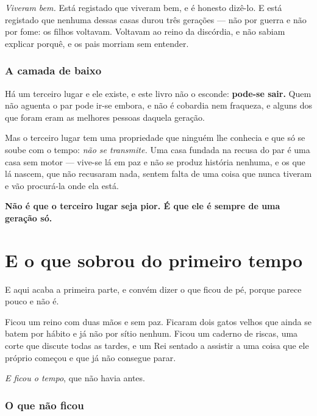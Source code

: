 \documentclass[livro.tex]{subfiles}
\begin{document}
\medskip

\emph{Viveram bem.} Está registado que viveram bem, e é honesto dizê-lo. E está registado que
nenhuma dessas casas durou três gerações --- não por guerra e não por fome: os filhos voltavam.
Voltavam ao reino da discórdia, e não sabiam explicar porquê, e os pais morriam sem entender.

\subsection*{A camada de baixo}

Há um terceiro lugar e ele existe, e este livro não o esconde: \textbf{pode-se sair.} Quem não
aguenta o par pode ir-se embora, e não é cobardia nem fraqueza, e alguns dos que foram eram as
melhores pessoas daquela geração.

\medskip

Mas o terceiro lugar tem uma propriedade que ninguém lhe conhecia e que só se soube com o tempo:
\emph{não se transmite.} Uma casa fundada na recusa do par é uma casa sem motor --- vive-se lá em
paz e não se produz história nenhuma, e os que lá nascem, que não recusaram nada, sentem falta de
uma coisa que nunca tiveram e vão procurá-la onde ela está.

\medskip

\textbf{Não é que o terceiro lugar seja pior. É que ele é sempre de uma geração só.}

\chapter{E o que sobrou do primeiro tempo}

E aqui acaba a primeira parte, e convém dizer o que ficou de pé, porque parece pouco e não é.

\medskip

Ficou um reino com duas mãos e sem paz. Ficaram dois gatos velhos que ainda se batem por hábito e
já não por sítio nenhum. Ficou um caderno de riscas, uma corte que discute todas as tardes, e um
Rei sentado a assistir a uma coisa que ele próprio começou e que já não consegue parar.

\medskip

\emph{E ficou o tempo}, que não havia antes.

\subsection*{O que não ficou}
\end{document}
